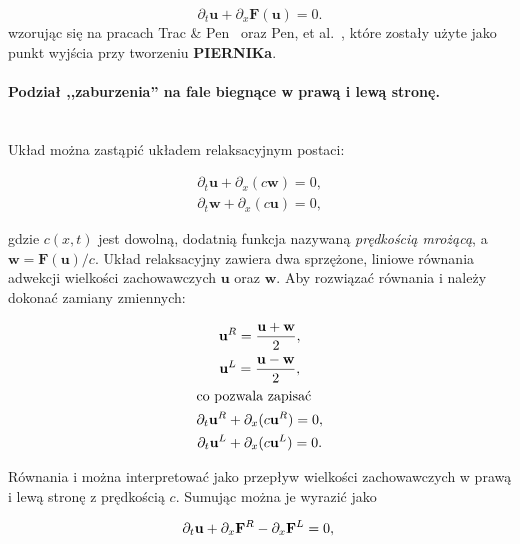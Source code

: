 \begin{equation}\label{diffeuler}
   \partial_t \mathbf{u} + \partial_{x} \mathbf{F}(\mathbf{u}) = 0.
\end{equation}
wzorując się na pracach Trac \& Pen~\cite*{2003PASP..115..303T}
oraz Pen, et al.~\cite*{2003ApJS..149..447P}, które zostały użyte jako punkt
wyjścia przy tworzeniu \textbf{PIERNIKa}. 

\paragraph{Podział ,,zaburzenia'' na fale biegnące w prawą i lewą stronę.} ~\\

Układ  można zastąpić układem relaksacyjnym postaci:

\begin{gather}
   \partial_t \mathbf{u} + \partial_x (c\mathbf{w}) = 0, \label{rel1}\\
   \partial_t \mathbf{w} + \partial_x (c\mathbf{u}) = 0, \label{rel2}
\end{gather}

gdzie $c(x,t)$ jest dowolną, dodatnią funkcja nazywaną \emph{prędkością
mrożącą}, a $\mathbf{w} = \mathbf{F}(\mathbf{u})/c$. Układ relaksacyjny zawiera
dwa sprzężone, liniowe równania adwekcji wielkości zachowawczych $\mathbf{u}$
oraz $\mathbf{w}$. Aby rozwiązać równania  i  należy
dokonać zamiany zmiennych:

\begin{gather}
   \mathbf{u}^R = \frac{\mathbf{u} + \mathbf{w}}{2}, \\
   \mathbf{u}^L = \frac{\mathbf{u} - \mathbf{w}}{2}, \\
   \intertext{co pozwala zapisać}
   \partial_t \mathbf{u}^R + \partial_x (c\mathbf{u}^R) = 0,\label{rel3}\\
   \partial_t \mathbf{u}^L + \partial_x (c\mathbf{u}^L) = 0.\label{rel4}
\end{gather}

Równania  i  można interpretować jako przepływ wielkości
zachowawczych w pra\-wą i lewą stronę z prędkością $c$. Sumując można je wyrazić
jako

\begin{equation}
   \partial_t \mathbf{u} + \partial_x \mathbf{F}^R - \partial_x \mathbf{F}^L = 0,\\
\end{equation}


